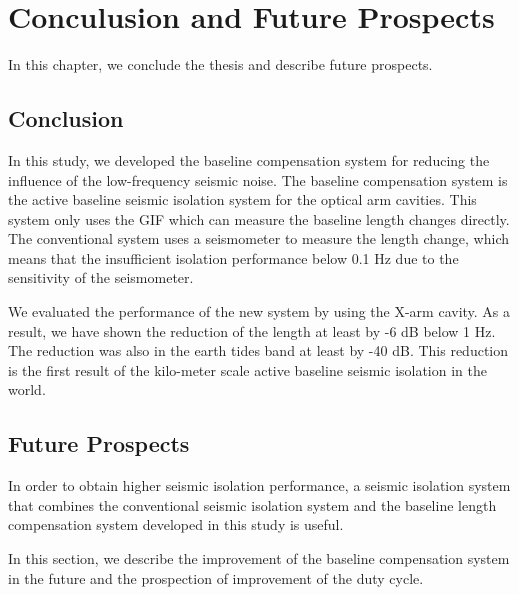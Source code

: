 \chapter{Conculusion and Future Prospects} \label{chap6}
In this chapter, we conclude the thesis and describe future prospects.

\section{Conclusion}
In this study, we developed the baseline compensation system for reducing the influence of the low-frequency seismic noise. The baseline compensation system is the active baseline seismic isolation system for the optical arm cavities. This system only uses the GIF which can measure the baseline length changes directly. The conventional system uses a seismometer to measure the length change, which means that the insufficient isolation performance below 0.1 Hz due to the sensitivity of the seismometer.

We evaluated the performance of the new system by using the X-arm cavity. As a result, we have shown the reduction of the length at least by -6 dB below 1 Hz. The reduction was also in the earth tides band at least by -40 dB. This reduction is the first result of the kilo-meter scale active baseline seismic isolation in the world.

\section{Future Prospects}
In order to obtain higher seismic isolation performance, a seismic isolation system that combines the conventional seismic isolation system and the baseline length compensation system developed in this study is useful.

In this section, we describe the improvement of the baseline compensation system in the future and the prospection of improvement of the duty cycle.


